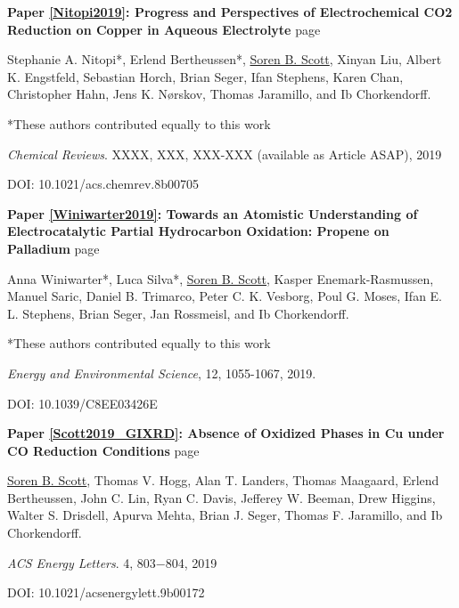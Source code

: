 \noindent\textbf{Paper \ref{Nitopi2019}: Progress and Perspectives of Electrochemical CO2 Reduction on Copper in Aqueous Electrolyte} \hfill page~\pageref{Nitopi2019}

Stephanie A. Nitopi*, Erlend Bertheussen*, \underline{Soren B. Scott}, Xinyan Liu, Albert K. Engstfeld, Sebastian Horch, Brian Seger, Ifan Stephens, Karen Chan, Christopher Hahn, Jens K. Nørskov, Thomas Jaramillo, and Ib Chorkendorff.

*These authors contributed equally to this work

\textit{Chemical Reviews}. XXXX, XXX, XXX-XXX (available as Article ASAP), 2019

DOI: 10.1021/acs.chemrev.8b00705


\vspace{5mm}
\noindent\textbf{Paper \ref{Winiwarter2019}: Towards an Atomistic Understanding of Electrocatalytic Partial Hydrocarbon Oxidation: Propene on Palladium} \hfill page~\pageref{Winiwarter2019}

Anna Winiwarter*, Luca Silva*, \underline{Soren B. Scott}, Kasper Enemark-Rasmussen, Manuel Saric, Daniel B. Trimarco, Peter C. K. Vesborg, Poul G. Moses, Ifan E. L. Stephens, Brian Seger, Jan Rossmeisl, and Ib Chorkendorff.

*These authors contributed equally to this work

\textit{Energy and Environmental Science}, 12, 1055-1067, 2019.

DOI:  10.1039/C8EE03426E


\vspace{5mm}
\noindent\textbf{Paper \ref{Scott2019_GIXRD}: Absence of Oxidized Phases in Cu under CO Reduction Conditions} \hfill page~\pageref{Scott2019_GIXRD}

\underline{Soren B. Scott}, Thomas V. Hogg, Alan T. Landers, Thomas Maagaard, Erlend Bertheussen, John C. Lin, Ryan C. Davis, Jefferey W. Beeman, Drew Higgins, Walter S. Drisdell, Apurva Mehta, Brian J. Seger, Thomas F. Jaramillo, and Ib Chorkendorff.

\textit{ACS Energy Letters}. 4, 803−804, 2019

DOI: 10.1021/acsenergylett.9b00172
